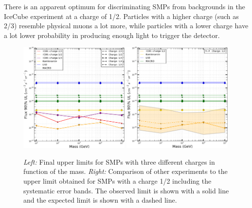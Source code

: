 \noindent There is an apparent optimum for discriminating SMPs from backgrounds in the IceCube experiment at a charge of 1/2. Particles with a higher charge (such as 2/3) resemble physical muons a lot more, while particles with a lower charge have a lot lower probability in producing enough light to trigger the detector.

\begin{figure}
\centering
\includegraphics[width=0.49\textwidth]{chapter8/img/UpperLimitPlot_massesOBSERVED.png}
\includegraphics[width=0.49\textwidth]{chapter8/img/UpperLimitPlot_masses_withunc_0p5}
\caption{\textit{Left: }Final upper limits for SMPs with three different charges in function of the mass. \textit{Right: }Comparison of other experiments to the upper limit obtained for SMPs with a charge 1/2 including the systematic error bands. The observed limit is shown with a solid line and the expected limit is shown with a dashed line.}
\label{fig:moneyplot1}
\end{figure}

